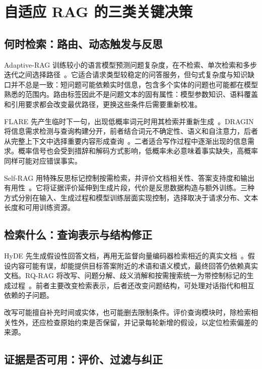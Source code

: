 \section{自适应 RAG 的三类关键决策}
\label{sec:adaptive}

\subsection{何时检索：路由、动态触发与反思}

 Adaptive-RAG 训练较小的语言模型预测问题复杂度，在不检索、单次检索和多步迭代之间选择路径~\citep{jeong2024adaptive}。它适合请求类型较稳定的问答服务，但句式复杂度与知识缺口并不总是一致：短问题可能依赖实时信息，包含多个实体的问题也可能都在模型熟悉的范围内。路由标签因此不是问题文本的固有属性：模型参数知识、语料覆盖和引用要求都会改变最优路径，更换这些条件后需要重新校准。

 FLARE 先产生临时下一句，出现低概率词元时用其检索并重新生成~\citep{jiang2023flare}。DRAGIN 将信息需求检测与查询构建分开，前者结合词元不确定性、语义和自注意力，后者从完整上下文中选择重要内容形成查询~\citep{su2024dragin}。二者适合写作过程中逐渐出现的信息需求。概率信号也会受到措辞和解码方式影响，低概率未必意味着事实缺失，高概率同样可能对应错误事实。

 Self-RAG 用特殊反思标记控制按需检索，并评价文档相关性、答案支持度和输出有用性~\citep{asai2024selfrag}。它将证据评价延伸到生成片段，代价是反思数据构造与额外训练。三种方式分别在输入、生成过程和模型训练层面实现控制，选择取决于请求分布、文本长度和可用训练资源。

\subsection{检索什么：查询表示与结构修正}

HyDE 先生成假设性回答文档，再用无监督向量编码器检索相近的真实文档~\citep{gao2023hyde}。假设内容可能有误，却能提供目标答案附近的术语和语义模式，最终回答仍依赖真实文档。RQ-RAG 将改写、问题分解、歧义消解和按需搜索统一为带控制标记的生成过程~\citep{chan2024rqrag}。前者主要改变检索表示，后者还改变问题结构，可处理对话指代和相互依赖的子问题。

改写可能擅自补充时间或实体，也可能删去限制条件。评价查询模块时，除检索相关性外，还应检查原始约束是否保留，并记录每轮新增的假设，以定位检索偏差的来源。

\subsection{证据是否可用：评价、过滤与纠正}

